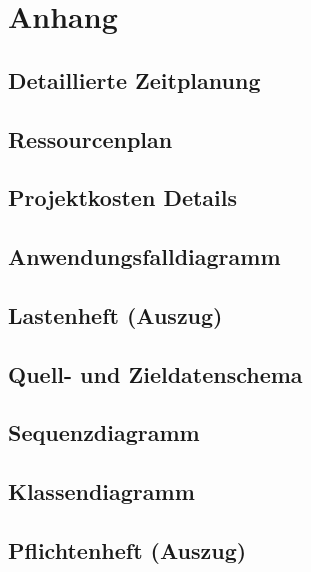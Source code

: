 \documentclass[12pt,toc=sectionentrywithoutdots, headheight=44pt, headings=optiontoheadandtoc]{scrartcl}
\begin{document}
\section{Anhang}
\subsection{Detaillierte Zeitplanung}
\blindtext

\subsection{Ressourcenplan}
\blindtext\blindtext

\subsection{Projektkosten Details}
\blindtext\blindtext

\subsection{Anwendungsfalldiagramm}
\blindtext\blindtext

\subsection{Lastenheft (Auszug)}
\blindtext\blindtext

\subsection{Quell- und Zieldatenschema}
\blindtext\blindtext

\subsection{Sequenzdiagramm}
\blindtext\blindtext

\subsection{Klassendiagramm}



\subsection{Pflichtenheft (Auszug)}
\blindtext
\end{document}
